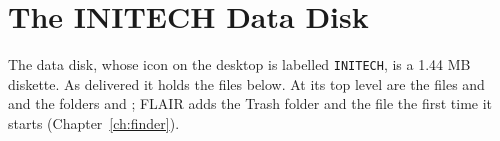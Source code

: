 \chapter{The INITECH Data Disk}

The data disk, whose icon on the desktop is labelled \texttt{INITECH}, is a
1.44 MB diskette.  As delivered it holds the files below.  At its top level
are the files  and  and the folders
 and ; FLAIR adds the
Trash folder and the file  the first time it starts
(Chapter~\ref{ch:finder}).

